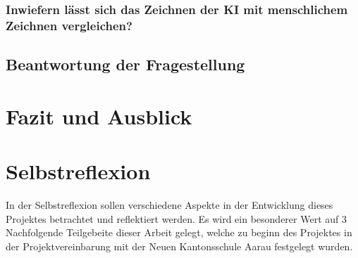 \subsubsection*{Inwiefern lässt sich das Zeichnen der KI mit menschlichem Zeichnen vergleichen?}



\subsection{Beantwortung der Fragestellung}

\section{Fazit und Ausblick}




\section{Selbstreflexion}
In der Selbstreflexion sollen verschiedene Aspekte in der Entwicklung dieses
Projektes betrachtet und reflektiert werden. Es wird ein besonderer Wert auf 3
Nachfolgende Teilgebeite dieser Arbeit gelegt, welche zu beginn des Projektes in
der Projektvereinbarung mit der Neuen Kantonsschule Aarau festgelegt wurden.

